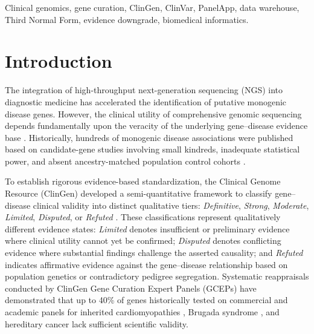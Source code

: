 \documentclass[conference]{IEEEtran}
\begin{document}
\begin{abstract}
laboratory assertions (15 cases), uningested panel curations (3 cases), and strict cross-disease phenotype boundaries (16 cases). In an empirical cross-sectional latency analysis of 51,007 active ClinVar assertions across 536 curated genes, the median elapsed discordance duration since ClinGen appraisal was 2.82 years (1,030 days; IQR: 2.98 years / 1,087 days). Retrospective exploratory machine learning yielded an AUROC of 0.857 and Brier score of 0.1508; prospective claims remain disabled pending longitudinal pre-curation feature reconstruction. CuraCascade provides an automated, vendor-neutral research audit framework to prioritize potential disease-specific discrepancies for clinical and genetic review.
\end{abstract}

\begin{IEEEkeywords}
Clinical genomics, gene curation, ClinGen, ClinVar, PanelApp, data warehouse, Third Normal Form, evidence downgrade, biomedical informatics.
\end{IEEEkeywords}

\section{Introduction}
The integration of high-throughput next-generation sequencing (NGS) into diagnostic medicine has accelerated the identification of putative monogenic disease genes. However, the clinical utility of comprehensive genomic sequencing depends fundamentally upon the veracity of the underlying gene--disease evidence base \cite{strande2017evaluating}. Historically, hundreds of monogenic disease associations were published based on candidate-gene studies involving small kindreds, inadequate statistical power, and absent ancestry-matched population control cohorts \cite{richards2015standards}. 

To establish rigorous evidence-based standardization, the Clinical Genome Resource (ClinGen) developed a semi-quantitative framework to classify gene--disease clinical validity into distinct qualitative tiers: \textit{Definitive}, \textit{Strong}, \textit{Moderate}, \textit{Limited}, \textit{Disputed}, or \textit{Refuted} \cite{strande2017evaluating, rehm2015clingen}. These classifications represent qualitatively different evidence states: \textit{Limited} denotes insufficient or preliminary evidence where clinical utility cannot yet be confirmed; \textit{Disputed} denotes conflicting evidence where substantial findings challenge the asserted causality; and \textit{Refuted} indicates affirmative evidence against the gene--disease relationship based on population genetics or contradictory pedigree segregation. Systematic reappraisals conducted by ClinGen Gene Curation Expert Panels (GCEPs) have demonstrated that up to 40\% of genes historically tested on commercial and academic panels for inherited cardiomyopathies \cite{kelly2018adaptation, ingles2019evaluating}, Brugada syndrome \cite{hosseini2018reappraisal}, and hereditary cancer \cite{lee2019clinical} lack sufficient scientific validity.
\end{document}
